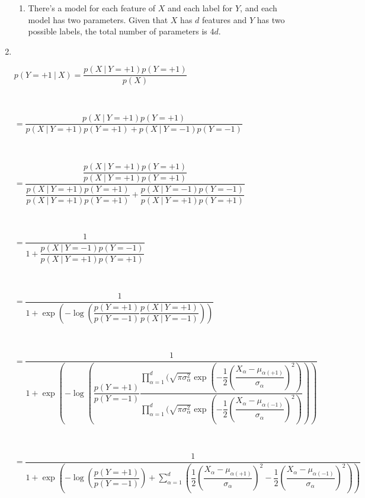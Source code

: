 \documentclass{article}
\begin{document}
\begin{enumerate}[label=(\alph*)]
\begin{enumerate}[label=(\roman*)]
    \item There's a model for each feature of $X$ and each label for $Y$, and each model has two parameters. Given that $X$ has $d$ features and $Y$ has two possible labels, the total number of parameters is $4d$.\\
\end{enumerate}

\item \ \\
\begin{center}$p(Y = +1\:|\:X) = \dfrac{p(X\:|\:Y=+1)p(Y=+1)}{p(X)}$ \end{center} \ \\

\begin{center}$=\dfrac{p(X\:|\:Y=+1)p(Y=+1)}{p(X\:|\:Y=+1)p(Y=+1) + p(X\:|\:Y=-1)p(Y=-1)}$ \end{center} \ \\

\begin{center}$=\dfrac{\dfrac{p(X\:|\:Y=+1)p(Y=+1)}{p(X\:|\:Y=+1)p(Y=+1)}}
{\dfrac{p(X\:|\:Y=+1)p(Y=+1)}{p(X\:|\:Y=+1)p(Y=+1)} + \dfrac{p(X\:|\:Y=-1)p(Y=-1)}{p(X\:|\:Y=+1)p(Y=+1)}}$\end{center} \ \\

\begin{center}$=\dfrac{1}{1 + \dfrac{p(X\:|\:Y=-1)p(Y=-1)}{p(X\:|\:Y=+1)p(Y=+1)}}$\end{center} \ \\

\begin{center}$=\dfrac{1}
{1 + \exp\left(-\log\left(\dfrac{p(Y=+1)}{p(Y=-1)}\dfrac{p(X\:|\:Y=+1)}{p(X\:|\:Y=-1)}\right)\right)}$\end{center} \ \\

\begin{center}$=\dfrac{1}
{1 + \exp\left(-\log\left(\dfrac{p(Y=+1)}{p(Y=-1)}
\dfrac{\prod_{\alpha=1}^{d}(\sqrt{\pi\sigma_\alpha^2}\exp\left(-\dfrac{1}{2}\left(\dfrac{X_\alpha-\mu_{\alpha(+1)}}{\sigma_\alpha}\right)^2\right)}
{\prod_{\alpha=1}^{d}(\sqrt{\pi\sigma_\alpha^2}\exp\left(-\dfrac{1}{2}\left(\dfrac{X_\alpha-\mu_{\alpha(-1)}}{\sigma_\alpha}\right)^2\right)}\right)\right)}$\end{center} \ \\

\begin{center}$=\dfrac{1}
{1 + \exp\left(-\log\left(\dfrac{p(Y=+1)}{p(Y=-1)}\right) + 
\sum_{\alpha=1}^{d}\left(\dfrac{1}{2}\left(\dfrac{X_\alpha-\mu_{\alpha(+1)}}{\sigma_\alpha}\right)^2
- \dfrac{1}{2}\left(\dfrac{X_\alpha-\mu_{\alpha(-1)}}{\sigma_\alpha}\right)^2\right)\right)}$\end{center} \ \\


\end{enumerate}
\end{document}
